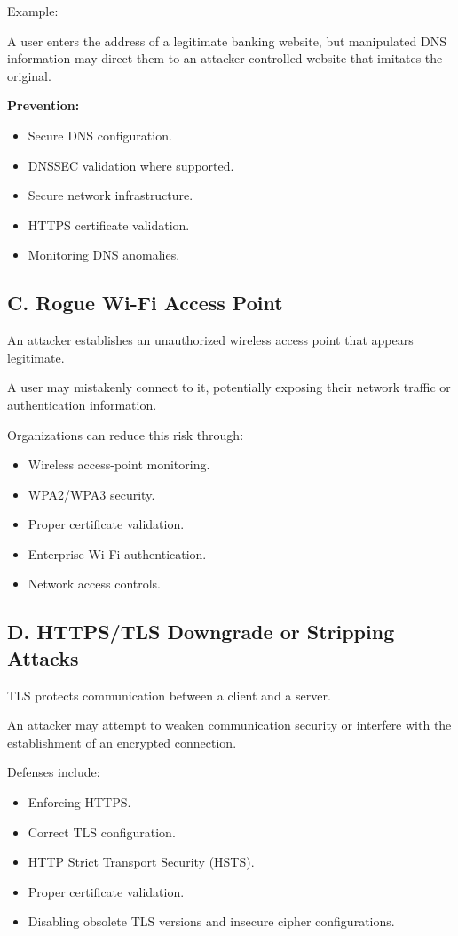Example:

A user enters the address of a legitimate banking website, but manipulated DNS information may direct them to an attacker-controlled website that imitates the original.

\textbf{Prevention:}

\begin{itemize}
\item Secure DNS configuration.
\item DNSSEC validation where supported.
\item Secure network infrastructure.
\item HTTPS certificate validation.
\item Monitoring DNS anomalies.
\end{itemize}

\subsection{C. Rogue Wi-Fi Access Point}

An attacker establishes an unauthorized wireless access point that appears legitimate.

A user may mistakenly connect to it, potentially exposing their network traffic or authentication information.

Organizations can reduce this risk through:

\begin{itemize}
\item Wireless access-point monitoring.
\item WPA2/WPA3 security.
\item Proper certificate validation.
\item Enterprise Wi-Fi authentication.
\item Network access controls.
\end{itemize}

\subsection{D. HTTPS/TLS Downgrade or Stripping Attacks}

TLS protects communication between a client and a server.

An attacker may attempt to weaken communication security or interfere with the establishment of an encrypted connection.

Defenses include:

\begin{itemize}
\item Enforcing HTTPS.
\item Correct TLS configuration.
\item HTTP Strict Transport Security (HSTS).
\item Proper certificate validation.
\item Disabling obsolete TLS versions and insecure cipher configurations.
\end{itemize}

